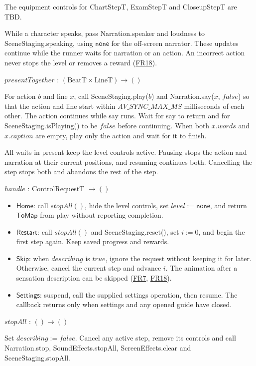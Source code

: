 \documentclass[10pt, titlepage]{article}
\newcommand{\srsurl}{https://team-hindsight.github.io/ophthamology-game/SRS/SRS.pdf}
\newcommand{\srsitemref}[2]{\href{\srsurl\#nameddest=#1}{#2}}
\newcommand{\T}[1]{\mathit{#1}}          %
\newcommand{\V}[1]{\mathsf{#1}}          %
\newcommand{\true}{\mathit{true}}
\newcommand{\false}{\mathit{false}}
\begin{document}
The equipment controls for ChartStepT, ExamStepT and CloseupStepT are TBD.

While a character speaks, pass Narration.speaker and loudness to
SceneStaging.speaking, using $\V{none}$ for the off-screen narrator.
These updates continue while the runner waits for narration or an action.
An incorrect action never stops the level or removes a reward
(\srsitemref{FR_NoPenalty}{FR18}).

\noindent $\T{presentTogether}$ : $(\text{BeatT} \times \text{LineT}) \to ()$

For action $b$ and line $x$, call SceneStaging.play($b$) and
Narration.say($x$, $\false$) so that the action and line start within
$\T{AV\_SYNC\_MAX\_MS}$ milliseconds of each other. The action continues
while say runs. Wait for say to return and for SceneStaging.isPlaying()
to be $\false$ before continuing. When both $x.\T{words}$ and
$x.\T{caption}$ are empty, play only the action and wait for it to finish.

All waits in present keep the level controls active. Pausing stops the
action and narration at their current positions, and resuming continues
both. Cancelling the step stops both and abandons the rest of the step.

\noindent $\T{handle}$ : ControlRequestT $\to ()$

\begin{itemize}
\item $\V{Home}$: call $\T{stopAll}()$, hide the level controls,
  set $\T{level} := \V{none}$, and return $\V{ToMap}$ from play
  without reporting completion.
\item $\V{Restart}$: call $\T{stopAll}()$ and SceneStaging.reset(),
  set $i := 0$, and begin the first step again. Keep saved progress and rewards.
\item $\V{Skip}$: when $\T{describing}$ is $\true$, ignore the request
  without keeping it for later. Otherwise, cancel the current step and
  advance $i$. The animation after a sensation description can be skipped
  (\srsitemref{FR_DescribeSensations}{FR7}, \srsitemref{FR_NoPenalty}{FR18}).
\item $\V{Settings}$: suspend, call the supplied settings operation,
  then resume. The callback returns only when settings and any opened
  guide have closed.
\end{itemize}

\noindent $\T{stopAll}$ : $() \to ()$

Set $\T{describing} := \false$. Cancel any active step, remove its controls and call Narration.stop,
SoundEffects.stopAll, ScreenEffects.clear and SceneStaging.stopAll.
\end{document}
